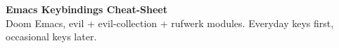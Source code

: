 \begin{center}
     \Large{\textbf{Emacs Keybindings Cheat-Sheet}} \\
     \normalsize Doom Emacs, evil + evil-collection + rufwerk modules. Everyday keys first, occasional keys later.
\end{center}
